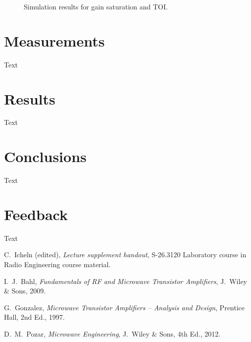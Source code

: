 \documentclass[a4paper, 12pt]{article}
\begin{document}
\begin{figure}[!h]

	\caption{Simulation results for gain saturation and TOI.}
	\label{f:hb}
\end{figure}

\newpage
\section{Measurements}

Text

\newpage
\section{Results}

Text

\newpage
\section{Conclusions}

Text

\newpage
\section{Feedback}

Text


\newpage
\begin{thebibliography}{9}%
	
 C.\ Icheln (edited), 
	\textit{Lecture supplement handout},
	S-26.3120 Laboratory course in Radio Engineering course material.
	
 I.\ J.\ Bahl, 
	\textit{Fundamentals of RF and Microwave Transistor Amplifiers},
	J.\ Wiley \& Sons, 2009.

 G.\ Gonzalez, 
	\textit{Microwave Transistor Amplifiers -- Analysis and Design},
	Prentice Hall, 2nd Ed., 1997.
	
 D.\ M.\ Pozar, 
	\textit{Microwave Engineering}, 
	J.\ Wiley \& Sons, 4th Ed., 2012.

\end{thebibliography}
\end{document}
